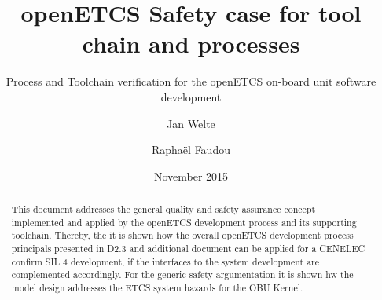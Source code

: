 \documentclass{template/openetcs_report}
\begin{document}
\frontmatter
{}




\title{openETCS Safety case for tool chain and processes}

\subtitle{Process and Toolchain verification for the openETCS on-board unit software development}

\date{November 2015} %

\creatorname{Jan Welte]}





\author{Jan Welte}
  
\author{Raphaël Faudou}

  






\begin{abstract}
This document addresses the general quality and safety assurance concept implemented and applied by the openETCS development process and its supporting toolchain. Thereby, the it is shown how the overall openETCS development process principals presented in D2.3 and  additional document can be applied for a CENELEC confirm SIL 4 development, if the interfaces to the system development are complemented accordingly. For the generic safety argumentation it is shown hw the model design addresses the ETCS system hazards for the OBU Kernel.






\end{abstract}
\end{document}
